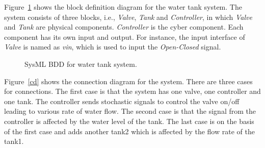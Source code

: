 Figure~\ref{myad} shows the block definition diagram for the water tank system. The system consists of three blocks, i.e., \emph{Valve}, \emph{Tank} and \emph{Controller}, in which \emph{Valve} and \emph{Tank} are physical components. \emph{Controller} is the cyber component. Each component has its own input and output. For instance, the input interface of \emph{Valve} is named as \emph{vin}, which is used to input the \emph{Open-Closed} signal. 
\begin{figure}[htbp]
	\caption{SysML BDD for water tank system.}
	\label{myad}
\end{figure}
Figure~\ref{cd} shows the connection diagram for the system. There are three cases for connections. The first case is that the system has one valve, one controller and one tank. The controller sends stochastic signals to control the valve on/off leading to various rate of water flow. The second case is that the signal from the controller is affected by the water level of the tank. The last case is on the basis of the first case and adds another tank2 which is affected by the flow rate of the tank1.

